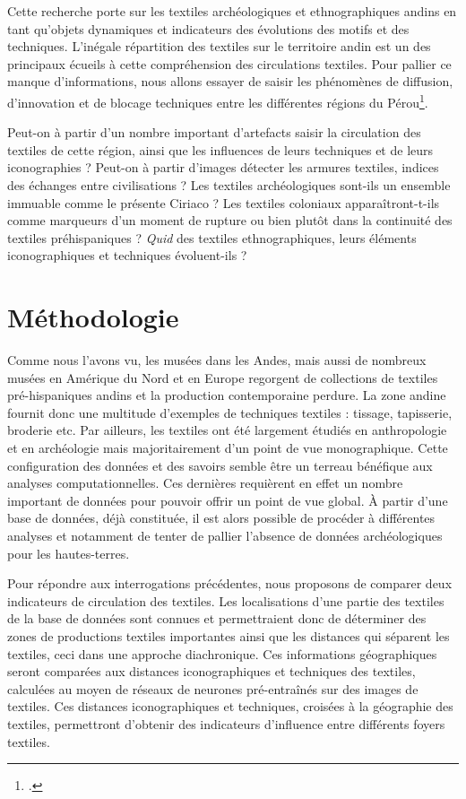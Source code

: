 
Cette recherche porte sur les textiles archéologiques et ethnographiques andins en tant qu'objets dynamiques et indicateurs des évolutions des motifs et des techniques. L'inégale répartition des textiles sur le territoire andin est un des principaux écueils à cette compréhension des circulations textiles. Pour pallier ce manque d'informations, nous allons essayer de saisir les \og phénomènes de diffusion, d'innovation et de blocage \fg \:techniques entre les différentes régions du Pérou\footcite[p.~264]{desrosiersTechniquesTissageOntelles2010}. 

Peut-on à partir d'un nombre important d'artefacts saisir la circulation des textiles de cette région, ainsi que les influences de leurs techniques et de leurs iconographies ? Peut-on à partir d'images détecter les armures textiles, indices des échanges entre civilisations ? Les textiles archéologiques sont-ils un ensemble immuable comme le présente Ciriaco ? Les textiles coloniaux apparaîtront-t-ils comme marqueurs d'un moment de rupture ou bien plutôt dans la continuité des textiles préhispaniques ? \textit{Quid} des textiles ethnographiques, leurs éléments iconographiques et techniques évoluent-ils ?


\section*{Méthodologie}


Comme nous l'avons vu, les musées dans les Andes, mais aussi de nombreux musées en Amérique du Nord et en Europe regorgent de collections de textiles pré-hispaniques andins et la production contemporaine perdure. La zone andine fournit donc une multitude d'exemples de techniques textiles : tissage, tapisserie, broderie etc. Par ailleurs, les textiles ont été largement étudiés en anthropologie et en archéologie mais majoritairement d'un point de vue monographique. Cette configuration des données et des savoirs semble être un terreau bénéfique aux analyses computationnelles. Ces dernières requièrent en effet un nombre important de données pour pouvoir offrir un point de vue global. À partir d'une base de données, déjà constituée, il est alors possible de procéder à différentes analyses et notamment de tenter de pallier l'absence de données archéologiques pour les hautes-terres. 

Pour répondre aux interrogations précédentes, nous proposons de comparer deux indicateurs de circulation des textiles. Les localisations d'une partie des textiles de la base de données sont connues et permettraient donc de déterminer des zones de productions textiles importantes ainsi que les distances qui séparent les textiles, ceci dans une approche diachronique. Ces informations géographiques seront comparées aux distances iconographiques et techniques des textiles, calculées au moyen de réseaux de neurones pré-entraînés sur des images de textiles. Ces distances iconographiques et techniques, croisées à la géographie des textiles, permettront d'obtenir des indicateurs d'influence entre différents foyers textiles.



